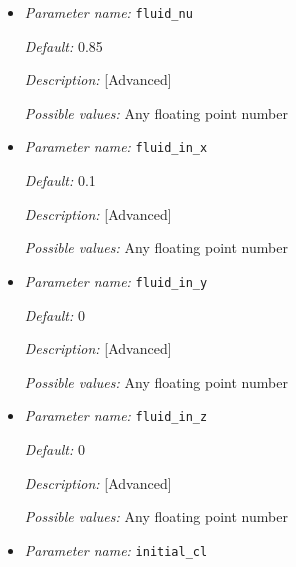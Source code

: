 \begin{itemize}
{\it Default:} 1e15

{\it Description:} [Standard] 

{\it Possible values:} Any floating point number


\item {\it Parameter name:} {\tt fluid\_nu}
\label{parameters:fluid_nu}


{\it Default:} 0.85

{\it Description:} [Advanced] 

{\it Possible values:} Any floating point number


\item {\it Parameter name:} {\tt fluid\_in\_x}
\label{parameters:fluid_in_x}


{\it Default:} 0.1

{\it Description:} [Advanced] 

{\it Possible values:} Any floating point number


\item {\it Parameter name:} {\tt fluid\_in\_y}
\label{parameters:fluid_in_y}


{\it Default:} 0

{\it Description:} [Advanced] 

{\it Possible values:} Any floating point number


\item {\it Parameter name:} {\tt fluid\_in\_z}
\label{parameters:fluid_in_z}


{\it Default:} 0

{\it Description:} [Advanced] 

{\it Possible values:} Any floating point number


\item {\it Parameter name:} {\tt initial\_cl}
\label{parameters:initial_cl}



\end{itemize}
